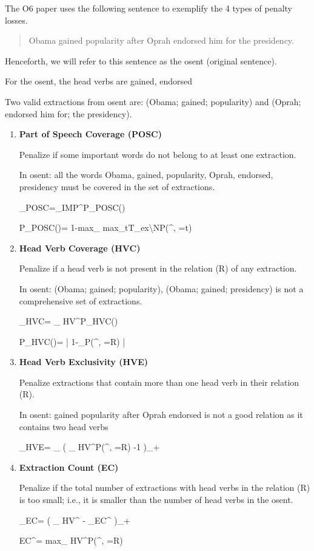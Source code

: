 The O6 paper uses the following sentence
to exemplify the 4 types
of penalty losses.

\begin{quote}\color{red}
Obama gained popularity after
Oprah endorsed him for the presidency.
\end{quote}
Henceforth, we will refer to
this sentence as the osent (original sentence).

For the osent, the head verbs are {\color{red} gained, endorsed}

Two valid extractions from osent are:
{\color{red}(Obama; gained; popularity)}
and {\color{red}(Oprah; endorsed him for;
 the presidency)}.


\begin{enumerate}

\item {\bf Part of Speech Coverage (POSC)}

Penalize if
some important words do not belong to at least one extraction.

In osent: all the words {\color{red}Obama, gained, popularity,
Oprah, endorsed, presidency} must be covered in
the set of extractions.

\beq
\call_{POSC}=\sum_{\alp\in [\ell]}IMP^{\alp}P_{POSC}(\alp)
\eeq

\beq
P_{POSC}(\alp)=
1-{\rm max}_{\mu\in [M]}
{\rm max}_{t\in T_{ex}\backslash N}P(\rvt^{\mu, \alp}=t)
\eeq

\item {\bf Head Verb Coverage (HVC)}

Penalize if a head verb
is not present in the relation (R) of any extraction.

In osent: {\color{red} (Obama;
gained; popularity), (Obama; gained; presidency)} is not a comprehensive set of extractions.

\beq
\call_{HVC}=
\sum_{\alp\in [\ell]}
HV^\alp P_{HVC}(\alp)
\eeq

\beq
P_{HVC}(\alp)=
\left|
1-\sum_{\mu\in [M]}P(\rvt^{\mu, \alp}=R)
\right|
\eeq

\item {\bf Head Verb Exclusivity (HVE)}

Penalize extractions that
contain more than one head verb in their relation (R).

In osent: {\color{red}gained popularity after Oprah endorsed} is not a good relation as it contains two
head verbs

\beq
\call_{HVE}=
\sum_{\mu\in [M]}
\left(
\sum_{\alp\in [\ell]}
HV^\alp P(\rvt^{\mu, \alp}=R)
-1
\right)_+
\eeq

\item {\bf Extraction Count (EC)}

Penalize if the total number of extractions with head verbs in the relation (R)
is too small; i.e., it is smaller
 than the number of head verbs
in the osent.

\beq
\call_{EC}=
\left(
\sum_{\alp\in[\ell]} HV^\alp
-
\sum_{\mu\in [M]}EC^\mu
\right)_+
\eeq

\beq
EC^\mu=
{\rm max}_{\alp\in [\ell]}
HV^\alp P(\rvt^{\mu, \alp}=R)
\eeq


\end{enumerate}
